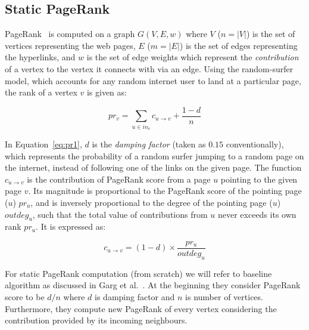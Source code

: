\subsection{Static PageRank}

PageRank~\cite{page} is computed on a graph $G(V, E, w)$ where $V$ ($n = |V|$) is the set of vertices representing the web pages, $E$ ($m = |E|$) is the set of edges representing the hyperlinks, and $w$ is the set of edge weights which represent the \emph{contribution} of a vertex to the vertex it connects with via an edge. Using the random-surfer model, which accounts for any random internet user to land at a particular page, the rank of a vertex $v$ is given as:

\begin{equation}
\label{eq:pr1}
    pr_v = \sum_{u \in in_v} c_{u \rightarrow v} + \frac{1 - d}{n}
\end{equation}

In Equation~\ref{eq:pr1}, $d$ is the \emph{damping factor} (taken as $0.15$ conventionally), which represents the probability of a random surfer jumping to a random page on the internet, instead of following one of the links on the given page. The function $c_{u \rightarrow v}$ is the contribution of PageRank score from a page $u$ pointing to the given page $v$. Its magnitude is proportional to the PageRank score of the pointing page ($u$) $pr_u$, and is inversely proportional to the degree of the pointing page ($u$) $outdeg_u$, such that the total value of contributions from $u$ never exceeds its own rank $pr_u$. It is expressed as:

\begin{equation}
\label{eq:pr2}
c_{u \rightarrow v} = (1 - d) \times  \frac{pr_u}{outdeg_u}
\end{equation}

For static PageRank computation (from scratch) we will refer to baseline algorithm as discussed in Garg et al.~\cite{pr-sticd16}. At the beginning they consider PageRank score to be $d/n$ where $d$ is damping factor and $n$ is number of vertices. Furthermore, they compute new PageRank of every vertex considering the contribution provided by its incoming neighbours.

